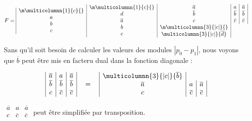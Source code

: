 \[ F= 
\begin{array}{|c} \m\multicolumnn{1}{c}{}\\  a \\ b \\ c\\ \end{array} \begin{array}{|c}  \m\multicolumnn{1}{c}{} \\   d \\ \overline{a} \\ b \\ c \\ \end{array} \begin{array}{|c|c|c|}  \overline{a} & a &  \overline{a} \\
      \overline{b} & \overline{b} & \overline{b} \\
      c & \overline{c} & \overline{c} \\     \m\multicolumnn{3}{|c|}{\overline{}}\\
\multicolumnn{3}{|c|}{\overline{d}}\\
      \end{array}   
\]



Sans qu'il soit besoin de calculer les valeurs des modules $| p_0 - p_1|$, nous voyons que $\overline{b}$ peut être mis en facteru dual dans la fonction diagonale : 




\[
 \begin{array}{|c|c|c|} \overline{a} & a & \overline{a} \\
                       \overline{b} &  \overline{b} &  \overline{b} \\
                      c            &  \overline{c} &  \overline{c}  \\    
\end{array}   \quad = \quad  
        \begin{array}{|c|c|c|} 
\multicolumnn{3}{|c|}{\overline{b}} \\
                              \overline{a} & a & \overline{a} \\
                                   c    & \overline{c} & \overline{c} \\
       \end{array}        
\]



$\begin{array}{|c|c|c|} 
	\overline{a} & a & \overline{a} \\
	c & \overline{c} & \overline{c} \\
\end{array} $ peut être simplifiée par transposition. 



